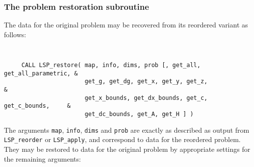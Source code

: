 \documentclass{galahad}
\newcommand{\packagename}{LSP}
\begin{document}
\subsubsection{The  problem restoration subroutine}
The data for the original problem may be recovered from its reordered 
variant as follows:
\vspace*{-2mm}
{\tt 
\begin{verbatim}
     CALL LSP_restore( map, info, dims, prob [, get_all, get_all_parametric, &
                       get_g, get_dg, get_x, get_y, get_z,                   &
                       get_x_bounds, get_dx_bounds, get_c, get_c_bounds,     &
                       get_dc_bounds, get_A, get_H ] )
\end{verbatim}
}
\vspace*{-1mm}
\noindent
The arguments {\tt map}, {\tt info}, {\tt dims} and {\tt prob} are 
exactly as described as output from 
{\tt \packagename\_reorder} or {\tt \packagename\_apply},
and correspond to data for the reordered problem. 
They may be restored to data for the original problem by appropriate 
settings for the remaining arguments: 
\end{document}
